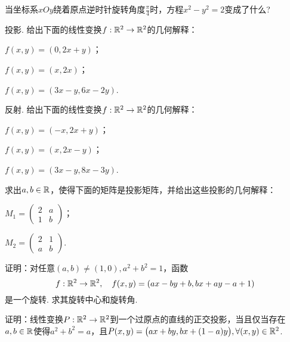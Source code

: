 \begin{problem}
  当坐标系$xOy$绕着原点逆时针旋转角度$\frac\pi4$时，方程$x^2-y^2=2$变成了什么?
\end{problem}

\begin{problem}
  {\kaishu 投影.} 给出下面的线性变换$f:\mathbb R^2\to\mathbb R^2$的几何解释：
  \begin{enum}
    \item $f(x,y)=(0,2x+y)$；
    \item $f(x,y)=(x,2x)$；
    \item $f(x,y)=(3x-y,6x-2y)$.
  \end{enum}
\end{problem}

\begin{problem}
  {\kaishu 反射.} 给出下面的线性变换$f:\mathbb R^2\to\mathbb R^2$的几何解释：
  \begin{enum}
    \item $f(x,y)=(-x,2x+y)$；
    \item $f(x,y)=(x,2x-y)$；
    \item $f(x,y)=(3x-y,8x-3y)$.
  \end{enum}
\end{problem}

\begin{problem}
  求出$a,b\in\mathbb R$，使得下面的矩阵是投影矩阵，并给出这些投影的几何解释：
  \begin{enum}
    \item $M_1=\begin{pmatrix}
      2 & a \\
      1 & b
    \end{pmatrix}$；
    \item $M_2=\begin{pmatrix}
      2 & 1 \\
      a & b
    \end{pmatrix}$.
  \end{enum}
\end{problem}

\begin{problem}
  证明：对任意$(a,b)\ne(1,0),a^2+b^2=1$，函数
  \[
    f:\mathbb R^2 \to \mathbb R^2 ,\quad f(x,y) = (ax - by + b, bx + ay - a + 1)
  \]
  是一个旋转. 求其旋转中心和旋转角.
\end{problem}

\begin{mybox}
  \begin{problem}[正交投影及其矩阵.]

    证明：线性变换$P:\mathbb R^2\to\mathbb R^2$到一个过原点的直线的正交投影，当且仅当存在$a,b\in\mathbb R$使得$a^2+b^2=a$，且$P(x,y)=\big(ax + by,bx+(1-a)y\big),\forall (x,y)\in\mathbb R^2$.
  \end{problem}
\end{mybox}

